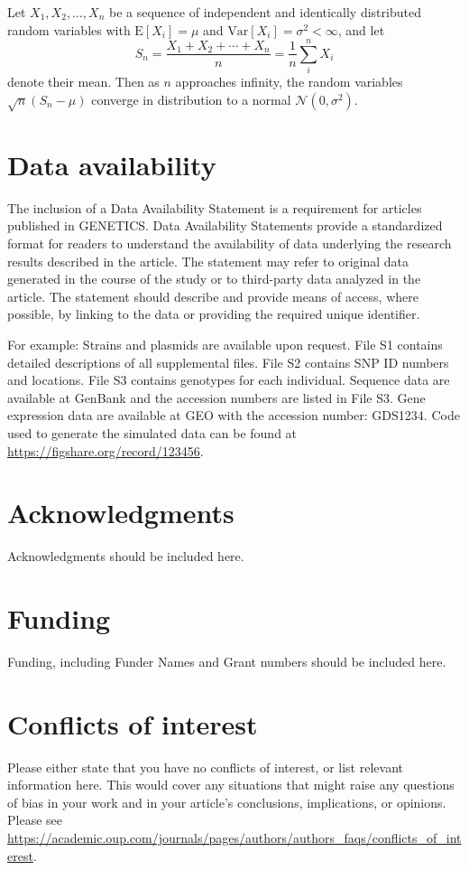 \documentclass[10pt,twocolumn,twoside,lineno]{gsajnl}
\begin{document}
Let $X_1, X_2, \ldots, X_n$ be a sequence of independent and identically distributed random variables with $\text{E}[X_i] = \mu$ and $\text{Var}[X_i] = \sigma^2 < \infty$, and let
\begin{equation}
S_n = \frac{X_1 + X_2 + \cdots + X_n}{n}
      = \frac{1}{n}\sum_{i}^{n} X_i
\label{eq:refname1}
\end{equation}
denote their mean. Then as $n$ approaches infinity, the random variables $\sqrt{n}(S_n - \mu)$ converge in distribution to a normal $\mathcal{N}(0, \sigma^2)$.

\section{Data availability}

The inclusion of a Data Availability Statement is a requirement for articles published in GENETICS. Data Availability Statements provide a standardized format for readers to understand the availability of data underlying the research results described in the article. The statement may refer to original data generated in the course of the study or to third-party data analyzed in the article. The statement should describe and provide means of access, where possible, by linking to the data or providing the required unique identifier.

For example: Strains and plasmids are available upon request. File S1 contains detailed descriptions of all supplemental files. File S2 contains SNP ID numbers and locations. File S3 contains genotypes for each individual. Sequence data are available at GenBank and the accession numbers are listed in File S3. Gene expression data are available at GEO with the accession number: GDS1234. Code used to generate the simulated data can be found at \url{https://figshare.org/record/123456}.

\section{Acknowledgments}
Acknowledgments should be included here.

\section{Funding}
Funding, including Funder Names and Grant numbers should be included here.

\section{Conflicts of interest}
Please either state that you have no conflicts of interest, or list relevant information here.  This would cover any situations that might raise any questions of bias in your work and in your article’s conclusions, implications, or opinions. Please see \url{https://academic.oup.com/journals/pages/authors/authors_faqs/conflicts_of_interest}.
\end{document}
